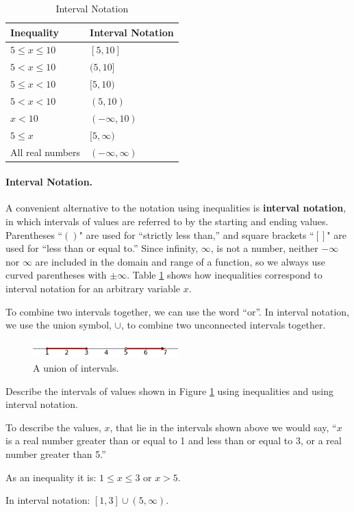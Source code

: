 \begin{table}
    \centering
\begin{tabular}{ll}
\toprule
\textbf{Inequality} & \textbf{Interval Notation}\tabularnewline
\midrule
$5\le x \le 10$  & $[5, 10]$\\
$5 <  x \le 10$  & $(5, 10]$\\
$5\le x  <  10$  & $[5, 10)$\\
$5 <  x  <  10$  & $(5, 10)$\\
$x < 10$         & $(-\infty, 10)$\\
$5 \le x$        & $[5, \infty)$\\
All real numbers & $(-\infty, \infty)$ \\
\bottomrule
\end{tabular}
\caption{Interval Notation}
\label{tab:1-interval}
\end{table}
\paragraph{Interval Notation.} A convenient alternative to the notation using inequalities is \textbf{interval notation}, in which intervals of values are referred to by the starting and ending values. Parentheses ``$()$" are used for ``strictly less than,'' and square brackets ``$[]$" are used for ``less than or equal to.'' Since infinity, $\infty$, is not a number, neither $-\infty$ nor $\infty$ are included in the domain and range of a function, so we always use curved parentheses with $\pm\infty$. Table \ref{tab:1-interval} shows how inequalities correspond to interval notation for an arbitrary variable $x$.

To combine two intervals together, we can use the word ``or''. In interval notation, we use the
union symbol, $\cup$, to combine two unconnected intervals together.

\begin{figure}[ht!]
\centering
\includegraphics[width=0.5\textwidth]{img/chap1/sec1-2/ex-1-2-11.png}
\caption{A union of intervals.}
\label{fig:1211}
\end{figure}

\begin{example}
Describe the intervals of values shown in Figure \ref{fig:1211} using inequalities and using interval notation.

\begin{solution} To describe the values, $x$, that lie in the intervals shown above
we would say, ``$x$ is a real number greater than or equal to 1 and
less than or equal to 3, or a real number greater than 5.''

As an inequality it is: $1\le x\le 3$ or $x > 5$.

In interval notation: $[1, 3]\cup(5, \infty)$.
\end{solution}\end{example}

